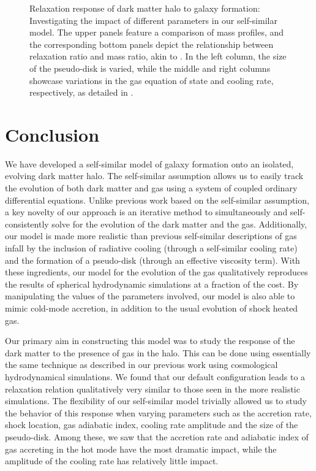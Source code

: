 \begin{figure}[htbp]
\caption{Relaxation response of dark matter halo to galaxy formation: Investigating the impact of different parameters in our self-similar model. The upper panels feature a comparison of mass profiles, and the corresponding bottom panels depict the relationship between relaxation ratio and mass ratio, akin to . In the left column, the size of the pseudo-disk is varied, while the middle and right columns showcase variations in the gas equation of state and cooling rate, respectively, as detailed in .}
\label{fig:relx_reln_all2-ch:ssr}
\end{figure}


\section{Conclusion}
\label{sec:conclusion-ch:ssr}
We have developed a self-similar model of galaxy formation onto an isolated, evolving dark matter halo. The self-similar assumption allows us to easily track the evolution of both dark matter and gas using a system of coupled ordinary differential equations. Unlike previous work based on the self-similar assumption, a key novelty of our approach is an iterative method to simultaneously and self-consistently solve for the evolution of the dark matter and the gas. Additionally, our model is made more realistic than previous self-similar descriptions of gas infall by the inclusion of radiative cooling (through a self-similar cooling rate) and the formation of a pseudo-disk (through an effective viscosity term). With these ingredients, our model for the evolution of the gas qualitatively reproduces the results of spherical hydrodynamic simulations at a fraction of the cost. By manipulating the values of the parameters involved, our model is also able to mimic cold-mode accretion, in addition to the usual evolution of shock heated gas.

Our primary aim in constructing this model was to study the response of the dark matter to the presence of gas in the halo. This can be done using essentially the same technique as described in our previous work using cosmological hydrodynamical simulations. We found that our default configuration leads to a relaxation relation qualitatively very similar to those seen in the more realistic simulations. The flexibility of our self-similar model trivially allowed us to study the behavior of this response when varying parameters such as the accretion rate, shock location, gas adiabatic index, cooling rate amplitude and the size of the pseudo-disk. Among these, we saw that the accretion rate and adiabatic index of gas accreting in the hot mode have the most dramatic impact, while the amplitude of the cooling rate has relatively little impact.

